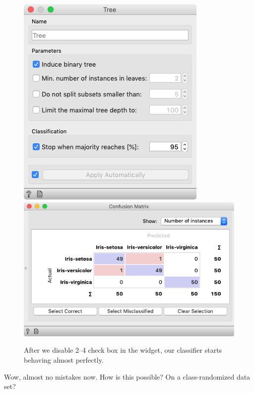\begin{figure}[h]
    \includegraphics[scale=0.35]{better_tree.png}
    \includegraphics[scale=0.35]{confusion_randomized_better.png}
    \caption{After we disable 2--4 check box in the  widget, our classifier starts behaving almost perfectly.}
\end{figure}


Wow, almost no mistakes now. How is this possible? On a class-randomized data set?

